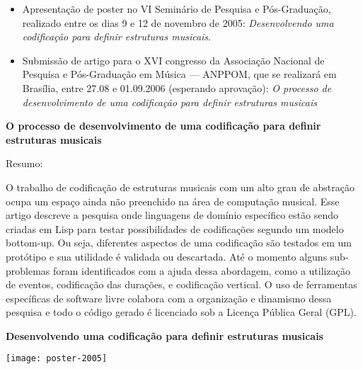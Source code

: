 \documentclass[11pt]{article}
\begin{document}

\begin{itemize}
\item Apresentação de poster no VI Seminário de Pesquisa e
  Pós-Graduação, realizado entre os dias 9 e 12 de novembro de 2005:
  \textit{Desenvolvendo uma codificação para definir estruturas
    musicais}.

\item Submissão de artigo para o XVI congresso da Associação Nacional
  de Pesquisa e Pós-Graduação em Música --- ANPPOM, que se realizará
  em Brasília, entre 27.08 e 01.09.2006 (esperando aprovação):
  \textit{O processo de desenvolvimento de uma codificação para
    definir estruturas musicais}
\end{itemize}

\label{sec:artigos}

\textbf{O processo de desenvolvimento de uma codificação para definir
estruturas musicais}

Resumo:

O trabalho de codificação de estruturas musicais com um alto grau de
abstração ocupa um espaço ainda não preenchido na área de computação
musical. Esse artigo descreve a pesquisa onde linguagens de domínio
específico estão sendo criadas em Lisp para testar possibilidades de
codificações segundo um modelo bottom-up. Ou seja, diferentes aspectos
de uma codificação são testados em um protótipo e sua utilidade é
validada ou descartada. Até o momento alguns sub-problemas foram
identificados com a ajuda dessa abordagem, como a utilização de
eventos, codificação das durações, e codificação vertical. O uso de
ferramentas específicas de software livre colabora com a organização e
dinamismo dessa pesquisa e todo o código gerado é licenciado sob a
Licença Pública Geral (GPL).

\textbf{Desenvolvendo uma codificação para definir estruturas musicais}

\texttt{[image: poster-2005]}
\end{document}
